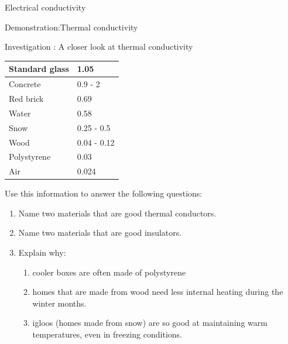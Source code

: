 \begin{iexperiment}{Electrical conductivity}
\begin{gexperiment}{Demonstration:Thermal conductivity}
\begin{gexperiment}{Investigation : A closer look at thermal conductivity}
{\begin{table}[H]
\begin{center}
\begin{tabular}{|l|l|}
Standard glass & 1.05 \\ \hline
Concrete & 0.9 - 2 \\ \hline
Red brick & 0.69 \\ \hline
Water & 0.58 \\ \hline
Snow & 0.25 - 0.5 \\ \hline
Wood & 0.04 - 0.12 \\ \hline
Polystyrene & 0.03 \\ \hline
Air & 0.024 \\ \hline
    \end{tabular}
      \end{center}
\end{table}
    \par
      \label{m38706*id67009}Use this information to answer the following questions:\par 
      \label{m38706*id67013}\begin{enumerate}[noitemsep, label=\textbf{\arabic*}. ] 
            \label{m38706*uid105}\item Name two materials that are good thermal conductors.
\label{m38706*uid106}\item Name two materials that are good insulators.
\label{m38706*uid107}\item Explain why:
\label{m38706*id67053}\begin{enumerate}[noitemsep, label=\textbf{\alph*}. ] 
            \label{m38706*uid108}\item cooler boxes are often made of polystyrene
\label{m38706*uid109}\item homes that are made from wood need less internal heating during the winter months.
\label{m38706*uid110}\item igloos (homes made from snow) are so good at maintaining warm temperatures, even in freezing conditions.
\end{enumerate}
        \end{enumerate}}
\end{gexperiment}
\label{m38706*notfhsst!!!underscore!!!id564}

\end{gexperiment}
\end{iexperiment}
